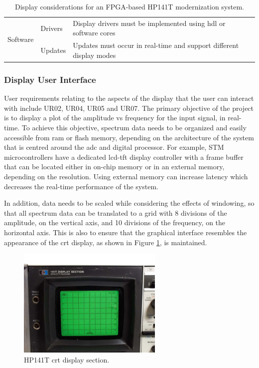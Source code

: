 \documentclass[class=report,11pt,crop=false]{standalone}
\begin{document}
\begin{table}[ht!]
\begin{tabular}{|m{8em}|m{10em}|m{22em}|}
			\multirow{2}{*}{Software} 
			& Drivers & Display drivers must be implemented using \acrshort{hdl} or software cores\\
			\cline{2-3}
			& Updates & Updates must occur in real-time and support different display modes \\
			\hline
		\end{tabular}
		\caption{Display considerations for an FPGA-based HP141T modernization system.}
		\label{tab:fpga-display-options}
	\end{table}
	
	\subsubsection{Display User Interface}

	User requirements relating to the aspects of the display that the user can interact with include UR02, UR04, UR05 and UR07. The primary objective of the project is to display a plot of the amplitude vs frequency for the input signal, in real-time. To achieve this objective, spectrum data needs to be organized and easily accessible from \acrshort{ram} or flash memory, depending on the architecture of the system that is centred around the \acrshort{adc} and digital processor. For example, STM microcontrollers have a dedicated \acrshort{lcd}-\acrshort{tft} display controller with a frame buffer that can be located either in on-chip memory or in an external memory, depending on the resolution. Using external memory can increase latency which decreases the real-time performance of the system. 
	
	In addition, data needs to be scaled while considering the effects of windowing, so that all spectrum data can be translated to a grid with 8 divisions of the amplitude, on the vertical axis, and 10 divisions of the frequency, on the horizontal axis. This is also to ensure that the graphical interface resembles the appearance of the \acrshort{crt} display, as shown in Figure \ref{fig:display-section}, is maintained.
	 
	\begin{figure}[ht!]
		\centering
		\includegraphics[width=0.62\textwidth]{Figures/Methodology/HP-Display-Section}
		\caption{HP141T \acrshort{crt} display section.}
		\label{fig:display-section}
	\end{figure}
	
\end{document}
